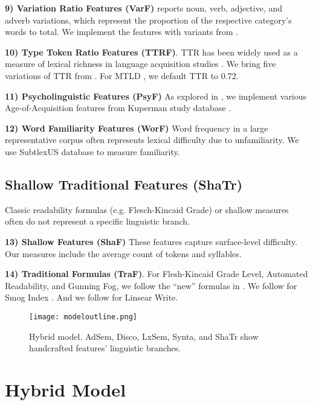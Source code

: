 \documentclass[11pt]{article}
\begin{document}
\textbf{9) Variation Ratio Features (VarF)} 
\citet{Lu:11} reports noun, verb, adjective, and adverb variations, which represent the proportion of the respective category's words to total. We implement the features with variants from \citet{Vajjala:12}.

\textbf{10) Type Token Ratio Features (TTRF)}. 
TTR has been widely used as a measure of lexical richness in language acquisition studies \citep{Malvern:12}. We bring five variations of TTR from \citet{Vajjala:12}. For MTLD \citep{mccarthy2010mtld}, we default TTR to 0.72.

\textbf{11) Psycholinguistic Features (PsyF)} 
As explored in \citet{vajjala2016readability}, we implement various Age-of-Acquisition features from Kuperman study database \citet{kuperman2012age}.

\textbf{12) Word Familiarity Features (WorF)} 
Word frequency in a large representative corpus often represents lexical difficulty \citep{Collins-Thompson:14} due to unfamiliarity. We use SubtlexUS database \citep{brysbaert2009moving} to measure familiarity.

\subsection{Shallow Traditional Features (ShaTr)}
Classic readability formulas (e.g. Flesch-Kincaid Grade) \citep{Kincaid:75} or shallow measures often do not represent a specific linguistic branch.

\textbf{13) Shallow Features (ShaF)}
These features capture surface-level difficulty. Our measures include the average count of tokens and syllables.

\textbf{14) Traditional Formulas (TraF)}. 
For Flesh-Kincaid Grade Level, Automated Readability, and Gunning Fog, we follow the ``new'' formulas in \citet{Kincaid:75}. We follow \citet{si2001statistical} for Smog Index \citep{mc1969smog}. And we follow \citet{eltorai2015readability} for Linsear Write. 

\begin{figure*}[h]
    \centering
    \texttt{[image: modeloutline.png]}
    \caption{Hybrid model. AdSem, Disco, LxSem, Synta, and ShaTr show handcrafted features' linguistic branches.}
    \label{fig:2}
\end{figure*}

\section{Hybrid Model}
\end{document}
